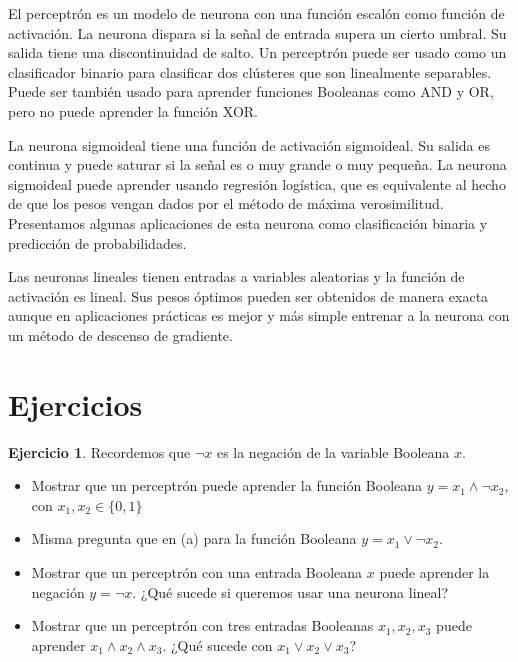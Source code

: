 \documentclass[12pt, a4paper]{amsbook}
\theoremstyle{remark}
\theoremstyle{definition}
\newtheorem{ejer}[teo]{Ejercicio}
\numberwithin{section}{chapter}
\numberwithin{subsection}{section}
\numberwithin{equation}{section}
\numberwithin{figure}{chapter}
\begin{document}
El perceptrón es un modelo de neurona con una función escalón como función de activación. La neurona dispara si la señal de entrada supera un cierto umbral. Su salida tiene una discontinuidad de salto. Un perceptrón puede ser usado como un clasificador binario para clasificar dos clústeres que son linealmente separables. Puede ser también usado para aprender funciones Booleanas como AND y OR, pero no puede aprender la función XOR.

La neurona sigmoideal tiene una función de activación sigmoideal. Su salida es continua y puede saturar si la señal es o muy grande o muy pequeña. La neurona sigmoideal puede aprender usando regresión logística, que es equivalente al hecho de que los pesos vengan dados por el método de máxima verosimilitud. Presentamos algunas aplicaciones de esta neurona como clasificación binaria y predicción de probabilidades.

Las neuronas lineales tienen entradas a variables aleatorias y la función de activación es lineal. Sus pesos óptimos pueden ser obtenidos de manera exacta aunque en aplicaciones prácticas es mejor y más simple entrenar a la neurona con un método de descenso de gradiente.

\section{Ejercicios}\label{sec.c5.8}

\begin{ejer}\label{ej.neg}
Recordemos que $\neg x$ es la negación de la variable Booleana $x$.
\begin{itemize}
\item[(a)] Mostrar que un perceptrón puede aprender la función Booleana $y=x_1\wedge \neg x_2$, con $x_1, x_2\in \{0,1\}$

\item[(b)] Misma pregunta que en (a) para la función Booleana $y=x_1\vee \neg x_2$.

\item[(c)] Mostrar que un perceptrón con una entrada Booleana $x$ puede aprender la negación $y=\neg x$. ¿Qué sucede si queremos usar una neurona lineal?

\item[(d)] Mostrar que un perceptrón con tres entradas Booleanas $x_1, x_2, x_3$ puede aprender $x_1\wedge x_2\wedge x_3$. ¿Qué sucede con $x_1\vee x_2\vee x_3$?
\end{itemize}
\end{ejer}
\end{document}
